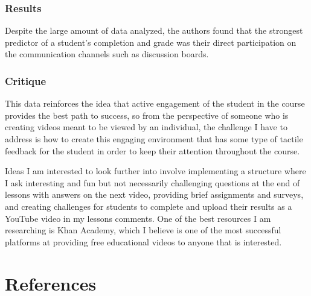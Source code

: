 \documentclass[
	letterpaper, %
]{jdf}
\begin{document}
\subsubsection{Results}
Despite the large amount of data analyzed, the authors found that the strongest predictor of a student's completion and grade was their direct participation on the communication channels such as discussion boards. 
\subsubsection{Critique}
This data reinforces the idea that active engagement of the student in the course provides the best path to success, so from the perspective of someone who is creating videos meant to be viewed by an individual, the challenge I have to address is how to create this engaging environment that has some type of tactile feedback for the student in order to keep their attention throughout the course.

Ideas I am interested to look further into involve implementing a structure where I ask interesting and fun but not necessarily challenging questions at the end of lessons with answers on the next video, providing brief assignments and surveys, and creating challenges for students to complete and upload their results as a YouTube video in my lessons comments. One of the best resources I am researching is Khan Academy, which I believe is one of the most successful platforms at providing free educational videos to anyone that is interested.

\section{References}
\printbibliography[heading=none]
\end{document}
